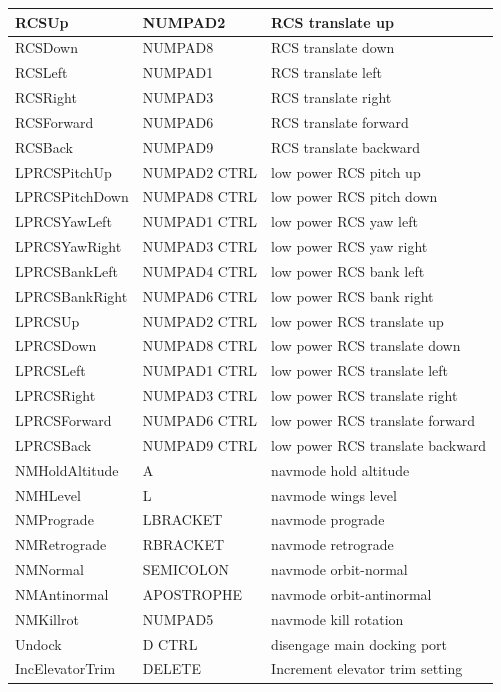 \documentclass[Orbiter User Manual.tex]{subfiles}
\begin{document}
\begin{longtable}{ p{} p{} p{} }
	RCSUp & NUMPAD2 & RCS translate up\\
	\hline
	RCSDown & NUMPAD8 & RCS translate down\\
	\hline
	RCSLeft & NUMPAD1 & RCS translate left\\
	\hline
	RCSRight & NUMPAD3 & RCS translate right\\
	\hline
	RCSForward & NUMPAD6 & RCS translate forward\\
	\hline
	RCSBack & NUMPAD9 & RCS translate backward\\
	\hline
	LPRCSPitchUp & NUMPAD2 CTRL & low power RCS pitch up\\
	\hline
	LPRCSPitchDown & NUMPAD8 CTRL & low power RCS pitch down\\
	\hline
	LPRCSYawLeft & NUMPAD1 CTRL & low power RCS yaw left\\
	\hline
	LPRCSYawRight & NUMPAD3 CTRL & low power RCS yaw right\\
	\hline
	LPRCSBankLeft & NUMPAD4 CTRL & low power RCS bank left\\
	\hline
	LPRCSBankRight & NUMPAD6 CTRL & low power RCS bank right\\
	\hline
	LPRCSUp & NUMPAD2 CTRL & low power RCS translate up\\
	\hline
	LPRCSDown & NUMPAD8 CTRL & low power RCS translate down\\
	\hline
	LPRCSLeft & NUMPAD1 CTRL & low power RCS translate left\\
	\hline
	LPRCSRight & NUMPAD3 CTRL & low power RCS translate right\\
	\hline
	LPRCSForward & NUMPAD6 CTRL & low power RCS translate forward\\
	\hline
	LPRCSBack & NUMPAD9 CTRL & low power RCS translate backward\\
	\hline
	NMHoldAltitude & A & navmode hold altitude\\
	\hline
	NMHLevel & L & navmode wings level\\
	\hline
	NMPrograde & LBRACKET & navmode prograde\\
	\hline
	NMRetrograde & RBRACKET & navmode retrograde\\
	\hline
	NMNormal & SEMICOLON & navmode orbit-normal\\
	\hline
	NMAntinormal & APOSTROPHE & navmode orbit-antinormal\\
	\hline
	NMKillrot & NUMPAD5 & navmode kill rotation\\
	\hline
	Undock & D CTRL & disengage main docking port\\
	\hline
	IncElevatorTrim & DELETE & Increment elevator trim setting\\

\end{longtable}
\end{document}

